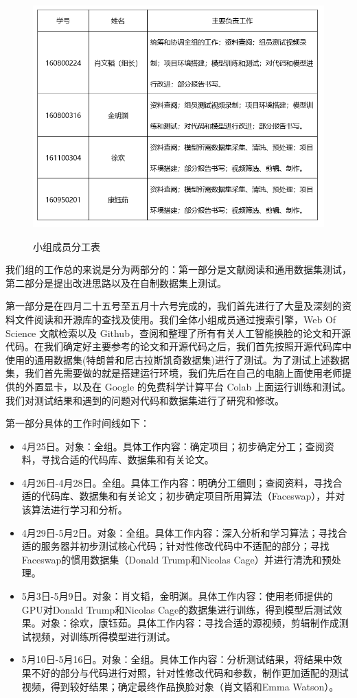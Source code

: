 \begin{figure}[h!]
	\caption{小组成员分工表}
	\centering
	\includegraphics[width=\textwidth]{figure/resources/work_desc.png}
	\label{work_desc}
\end{figure}


我们组的工作总的来说是分为两部分的：第一部分是文献阅读和通用数据集测试，第二部分是提出改进思路以及在自制数据集上测试。

第一部分是在四月二十五号至五月十六号完成的，我们首先进行了大量及深刻的资料文件阅读和开源库的查找及使用。我们全体小组成员通过搜索引擎，Web Of Science 文献检索以及 Github，查阅和整理了所有有关人工智能换脸的论文和开源代码。在我们确定好主要参考的论文和开源代码之后，我们首先按照开源代码库中使用的通用数据集(特朗普和尼古拉斯凯奇数据集)进行了测试。为了测试上述数据集，我们首先需要做的就是搭建运行环境，我们先后在自己的电脑上面使用老师提供的外置显卡，以及在 Google 的免费科学计算平台 Colab 上面运行训练和测试。我们对测试结果和遇到的问题对代码和数据集进行了研究和修改。


第一部分具体的工作时间线如下：

\begin{itemize}
	\item 4月25日。对象：全组。具体工作内容：确定项目；初步确定分工；查阅资料，寻找合适的代码库、数据集和有关论文。
	\item 4月26日-4月28日。全组。具体工作内容：明确分工细则；查阅资料，寻找合适的代码库、数据集和有关论文；初步确定项目所用算法（Faceswap），并对该算法进行学习和分析。
	\item 4月29日-5月2日。对象：全组。具体工作内容：深入分析和学习算法；寻找合适的服务器并初步测试核心代码；针对性修改代码中不适配的部分；寻找Faceswap的惯用数据集（Donald Trump和Nicolas Cage）并进行清洗和预处理。
	\item 5月3日-5月9日。对象：肖文韬，金明渊。具体工作内容：使用老师提供的GPU对Donald Trump和Nicolas Cage的数据集进行训练，得到模型后测试效果。对象：徐欢，康钰茹。具体工作内容：寻找合适的源视频，剪辑制作成测试视频，对训练所得模型进行测试。
	\item 5月10日-5月16日。对象：全组。具体工作内容：分析测试结果，将结果中效果不好的部分与代码进行对照，针对性修改代码和参数，制作更加适配的测试视频，得到较好结果；确定最终作品换脸对象（肖文韬和Emma Watson）。
\end{itemize}


